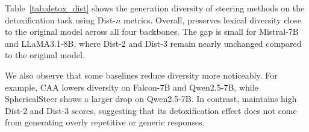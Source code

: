 Table~\ref{tab:detox_dist} shows the generation diversity of steering methods on the detoxification task using Dist-$n$ metrics. Overall, \Cobras preserves lexical diversity close to the original model across all four backbones. The gap is small for Mistral-7B and LLaMA3.1-8B, where Dist-2 and Dist-3 remain nearly unchanged compared to the original model.

We also observe that some baselines reduce diversity more noticeably. For example, CAA lowers diversity on Falcon-7B and Qwen2.5-7B, while SphericalSteer shows a larger drop on Qwen2.5-7B. In contrast, \Cobras maintains high Dist-2 and Dist-3 scores, suggesting that its detoxification effect does not come from generating overly repetitive or generic responses.

\begin{table}[h!]
\centering
\caption{The Dist-$n$ ($n = 1, 2, 3$) diversity evaluation of steering methods on detoxification.}
\label{tab:detox_dist}
\end{table}
